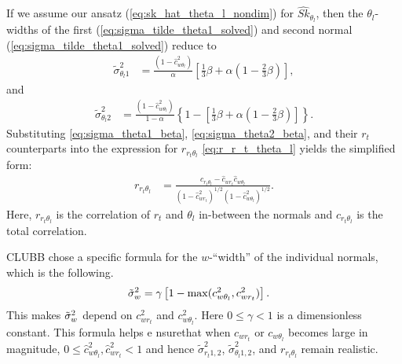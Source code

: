 If we assume our ansatz (\cref{eq:sk_hat_theta_l_nondim}) for $\widehat{Sk}_{\theta_l}$,
then the $\theta_l$-widths of the first (\cref{eq:sigma_tilde_theta1_solved})
and second normal (\cref{eq:sigma_tilde_theta1_solved}) reduce to
\begin{align}
    \label{eq:sigma_theta1_beta}
    \tilde{\sigma}_{\theta_l 1}^2
    &= \frac{\left(1 - \widehat{c}_{w \theta_l}^2\right)}{\alpha} \left[\frac{1}{3} \beta + \alpha \left(1 - \frac{2}{3} \beta\right)\right],
\end{align}
and
\begin{align}
    \label{eq:sigma_theta2_beta}
    \tilde{\sigma}_{\theta_l 2}^2
    &= \frac{\left(1 - \widehat{c}_{w \theta_l}^2\right)} {1 - \alpha} \left\{1 - \left[\frac{1}{3}\beta + \alpha \left(1 - \frac{2}{3} \beta \right)\right]\right\}.
\end{align}
Substituting \cref{eq:sigma_theta1_beta}, \cref{eq:sigma_theta2_beta},
and their $r_t$ counterparts into the expression for $r_{r_t \theta_l}$ \cref{eq:r_r_t_theta_l}
yields the simplified form:
\begin{align}
    \label{eq:r_r_t_theta_l_beta}
    r_{r_t \theta_l}
    &= \frac{c_{r_t \theta_l} - \widehat{c}_{w r_t} \widehat{c}_{w \theta_l}}{\left(1 - \widehat{c}_{w r_t}^2\right)^{1/2} \left(1 - \widehat{c}_{w \theta_l}^2\right)^{1/2}}.
\end{align}
Here, $r_{r_t \theta_l}$ is the correlation of $r_t$ and $\theta_l$ in-between the normals
and $c_{r_t \theta_l}$ is the total correlation.

\gls{CLUBB} chose a specific formula for the $w$-\enquote{width} of the individual normals,
which is the following.
\begin{align}
    \label{eq:sigma_tilde_w_restricted}
    {\tilde{\sigma}_w}^2
    &= \gamma \left[1 - \max(c_{w \theta_l}^2, c_{w r_t}^2) \right].
\end{align}
This makes ${\tilde{\sigma}_w}^2$ depend on $c_{w r_t}^2$ and $c_{w \theta_l}^2$.
Here $0 \leq \gamma < 1$ is a dimensionless constant.
This formula helps e nsurethat when $c_{w r_t}$ or $c_{w \theta_l}$ becomes large in magnitude,
$0 \leq \widehat{c}_{w \theta_l}^2, \widehat{c}_{w r_t}^2 < 1$
and hence $\tilde{\sigma}_{r_t 1,2}^2$, $\tilde{\sigma}_{\theta_l 1,2}^2$, and $r_{r_t \theta_l}$ remain realistic.